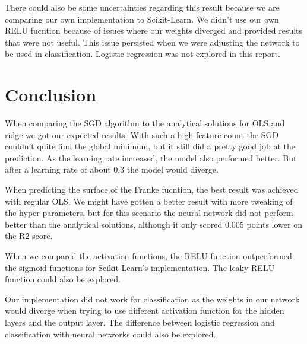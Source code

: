 \documentclass[12pt,a4paper]{article}
\begin{document}
There could also be some uncertainties regarding this result because we are comparing our own implementation to Scikit-Learn. We didn't use our own RELU fucntion because of issues where our weights diverged and provided results that were not useful. This issue persisted when we were adjusting the network to be used in classification. Logistic regression was not explored in this report.

\section{Conclusion}
When comparing the SGD algorithm to the analytical solutions for OLS and ridge we got our expected results. With such a high feature count the SGD couldn't quite find the global minimum, but it still did a pretty good job at the prediction. As the learning rate increased, the model also performed better. But after a learning rate of about 0.3 the model would diverge. 

When predicting the surface of the Franke fucntion, the best result was achieved with regular OLS. We might have gotten a better result with more tweaking of the hyper parameters, but for this scenario the neural network did not perform better than the analytical solutions, although it only scored 0.005 points lower on the R2 score. 

When we compared the activation functions, the RELU function outperformed the sigmoid functions for Scikit-Learn's implementation. The leaky RELU function could also be explored. 

Our implementation did not work for classification as the weights in our network would diverge when trying to use different activation function for the hidden layers and the output layer. The difference between logistic regression and classification with neural networks could also be explored.

\newpage



\end{document}
